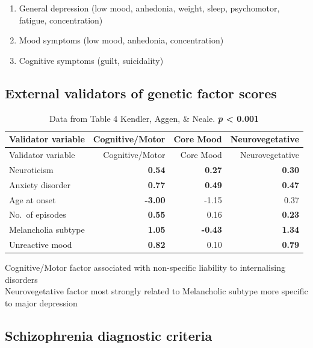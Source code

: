 \documentclass[
  letterpaper,
  DIV=11,
  numbers=noendperiod]{scrartcl}
\providecommand{\tightlist}{%
  \setlength{\itemsep}{0pt}\setlength{\parskip}{0pt}}
\begin{document}
\begin{enumerate}
\def\labelenumi{\arabic{enumi}.}
\tightlist
\item
  General depression (low mood, anhedonia, weight, sleep, psychomotor,
  fatigue, concentration)
\item
  Mood symptoms (low mood, anhedonia, concentration)
\item
  Cognitive symptoms (guilt, suicidality)
\end{enumerate}

\subsection{External validators of genetic factor
scores}\label{external-validators-of-genetic-factor-scores}

\begin{longtable}[]{@{}lrrr@{}}
\caption{Data from Table 4 Kendler, Aggen, \& Neale. \textbf{\emph{p}
\textless{} 0.001}}\tabularnewline
\toprule\noalign{}
Validator variable & Cognitive/Motor & Core Mood & Neurovegetative \\
\midrule\noalign{}
\endfirsthead
\toprule\noalign{}
Validator variable & Cognitive/Motor & Core Mood & Neurovegetative \\
\midrule\noalign{}
\endhead
\bottomrule\noalign{}
\endlastfoot
Neuroticism & \textbf{0.54} & \textbf{0.27} & \textbf{0.30} \\
Anxiety disorder & \textbf{0.77} & \textbf{0.49} & \textbf{0.47} \\
Age at onset & \textbf{-3.00} & -1.15 & 0.37 \\
No.~of episodes & \textbf{0.55} & 0.16 & \textbf{0.23} \\
Melancholia subtype & \textbf{1.05} & \textbf{-0.43} & \textbf{1.34} \\
Unreactive mood & \textbf{0.82} & 0.10 & \textbf{0.79} \\
\end{longtable}

Cognitive/Motor factor associated with non-specific liability to
internalising disorders\\
Neurovegetative factor most strongly related to Melancholic subtype more
specific to major depression

\subsection{Schizophrenia diagnostic
criteria}\label{schizophrenia-diagnostic-criteria}
\end{document}
